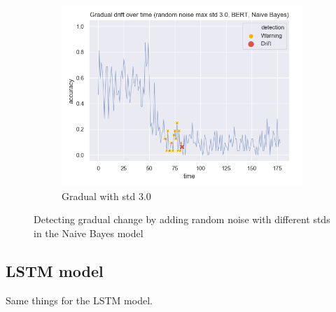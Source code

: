 \documentclass[12pt]{report}
\begin{document}
\begin{figure}[H]
\begin{subfigure}{.5\textwidth}
\end{subfigure}
\begin{subfigure}{.5\textwidth}
  \centering
  \includegraphics[width=\linewidth]{assets/detecting-change/gradual_noise_random_std_3_nb_wos_1_BERT.png}
  \caption{Gradual with std 3.0}
  \label{fig:nb-gradual-std-3}
\end{subfigure}
\caption{Detecting gradual change by adding random noise with different stds in the Naive Bayes model}
\label{fig:nb-gradual}
\end{figure}

\subsection{LSTM model}

Same things for the LSTM model.
\end{document}

